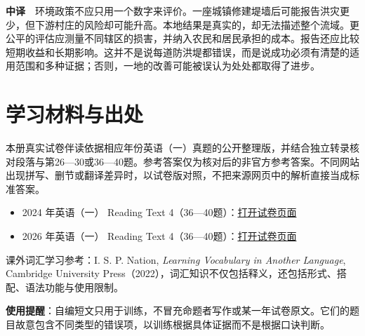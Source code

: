 \documentclass[
  11pt,
]{ctexart}
\begin{document}
\textbf{中译}　环境政策不应只用一个数字来评价。一座城镇修建堤墙后可能报告洪灾更少，但下游村庄的风险却可能升高。本地结果是真实的，却无法描述整个流域。更公平的评估应测量不同辖区的损害，并纳入农民和居民承担的成本。报告还应比较短期收益和长期影响。这并不是说每道防洪堤都错误，而是说成功必须有清楚的适用范围和多种证据；否则，一地的改善可能被误认为处处都取得了进步。

\clearpage

\section{学习材料与出处}\label{ux5b66ux4e60ux6750ux6599ux4e0eux51faux5904}

本册真实试卷伴读依据相应年份英语（一）真题的公开整理版，并结合独立转录核对段落与第26---30或36---40题。参考答案仅为核对后的非官方参考答案。不同网站出现拼写、删节或翻译差异时，以试卷版对照，不把来源网页中的解析直接当成标准答案。

\begin{itemize}
\item
  2024 年英语（一） Reading Text
  4（36---40题）：\href{https://ac-wiki.org/general-skills/study/assets/2024-201.pdf}{打开试卷页面}
\item
  2026 年英语（一） Reading Text
  4（36---40题）：\href{https://english-exam.lazynote.cn/kaoyan/sections/2026-english-one/section2-part-a-4/}{打开试卷页面}
\end{itemize}

课外词汇学习参考：I. S. P. Nation, \emph{Learning Vocabulary in Another
Language}, Cambridge University
Press（2022），词汇知识不仅包括释义，还包括形式、搭配、语法功能与使用限制。

\textbf{使用提醒}：自编短文只用于训练，不冒充命题者写作或某一年试卷原文。它们的题目故意包含不同类型的错误项，以训练根据具体证据而不是根据口诀判断。
\end{document}
